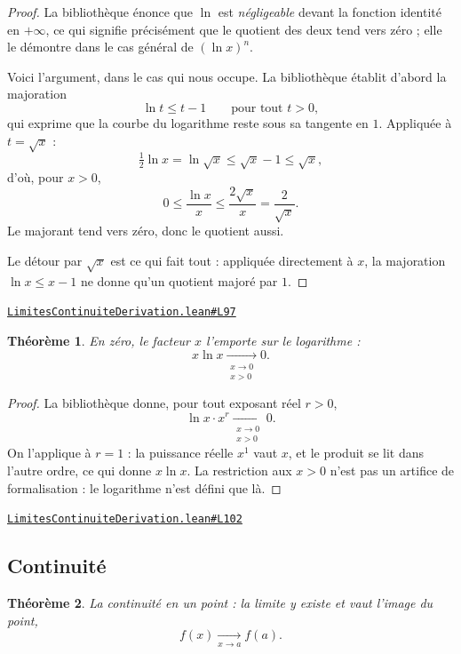 \documentclass[11pt,a4paper]{article}
\theoremstyle{definition}
\theoremstyle{plain}
\newtheorem{theoreme}{Théorème}
\newcommand{\source}[2]{\par\smallskip\noindent\hfill{\footnotesize\href{#1}{\texttt{#2}}}\par\smallskip}
\begin{document}
\begin{proof}
La bibliothèque énonce que $\ln$ est \emph{négligeable} devant la fonction identité en
$+\infty$, ce qui signifie précisément que le quotient des deux tend vers zéro ; elle le
démontre dans le cas général de $(\ln x)^n$.

Voici l'argument, dans le cas qui nous occupe. La bibliothèque établit d'abord la
majoration
\[ \ln t \le t - 1 \qquad \text{pour tout } t > 0 , \]
qui exprime que la courbe du logarithme reste sous sa tangente en $1$. Appliquée à
$t = \sqrt x$ :
\[ \tfrac12 \ln x = \ln \sqrt x \le \sqrt x - 1 \le \sqrt x , \]
d'où, pour $x > 0$,
\[ 0 \le \frac{\ln x}{x} \le \frac{2\sqrt x}{x} = \frac{2}{\sqrt x} . \]
Le majorant tend vers zéro, donc le quotient aussi.

Le détour par $\sqrt x$ est ce qui fait tout : appliquée directement à $x$, la majoration
$\ln x \le x - 1$ ne donne qu'un quotient majoré par $1$.
\end{proof}
\source{https://github.com/Commutator-IO/learn-lean/blob/main/courses/02-lycee/04-limites-continuite-derivation/LimitesContinuiteDerivation.lean\#L97}{LimitesContinuiteDerivation.lean\#L97}

\begin{theoreme}
En zéro, le facteur $x$ l'emporte sur le logarithme :
\[ x \ln x \xrightarrow[\substack{x \to 0 \\ x > 0}]{} 0 . \]
\end{theoreme}

\begin{proof}
La bibliothèque donne, pour tout exposant réel $r > 0$,
\[ \ln x \cdot x^{r} \xrightarrow[\substack{x \to 0 \\ x > 0}]{} 0 . \]
On l'applique à $r = 1$ : la puissance réelle $x^{1}$ vaut $x$, et le produit se lit dans
l'autre ordre, ce qui donne $x \ln x$. La restriction aux $x > 0$ n'est pas un artifice de
formalisation : le logarithme n'est défini que là.
\end{proof}
\source{https://github.com/Commutator-IO/learn-lean/blob/main/courses/02-lycee/04-limites-continuite-derivation/LimitesContinuiteDerivation.lean\#L102}{LimitesContinuiteDerivation.lean\#L102}

\subsection{Continuité}

\begin{theoreme}
La continuité en un point : la limite y existe et vaut l'image du point,
\[ f(x) \xrightarrow[x \to a]{} f(a) . \]
\end{theoreme}
\end{document}
